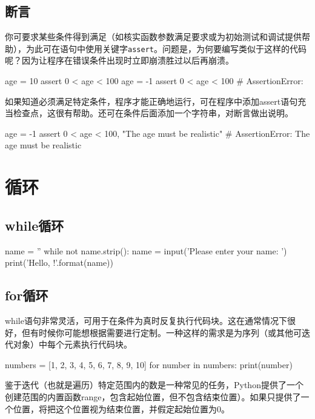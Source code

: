 \subsection{断言}
你可要求某些条件得到满足（如核实函数参数满足要求或为初始测试和调试提供帮助），为此可在语句中使用关键字\verb|assert|。问题是，为何要编写类似于这样的代码呢？因为让程序在错误条件出现时立即崩溃胜过以后再崩溃。
\begin{pyc}
age = 10
assert 0 < age < 100
age = -1
assert 0 < age < 100  # AssertionError:
\end{pyc}
如果知道必须满足特定条件，程序才能正确地运行，可在程序中添加assert语句充当检查点，这很有帮助。还可在条件后面添加一个字符串，对断言做出说明。
\begin{pyc}
age = -1
assert 0 < age < 100, "The age must be realistic"
# AssertionError: The age must be realistic
\end{pyc}
\section{循环\label{section5.5}}
\subsection{while循环}
\begin{pyc}
    name = ''
    while not name.strip():
        name = input('Please enter your name: ')
    print('Hello, {}!'.format(name))
\end{pyc}
\subsection{for循环}
while语句非常灵活，可用于在条件为真时反复执行代码块。这在通常情况下很好，但有时候你可能想根据需要进行定制。一种这样的需求是为序列（或其他可迭代对象）中每个元素执行代码块。
\begin{pyc}
numbers = [1, 2, 3, 4, 5, 6, 7, 8, 9, 10]
for number in numbers:
    print(number)
\end{pyc}
鉴于迭代（也就是遍历）特定范围内的数是一种常见的任务，Python提供了一个创建范围的内置函数range，包含起始位置，但不包含结束位置）。如果只提供了一个位置，将把这个位置视为结束位置，并假定起始位置为0。

